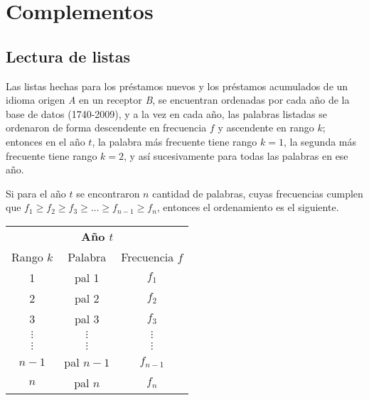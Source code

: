 \chapter{Complementos}

\section{Lectura de listas}
\label{lectura.listas}
 
Las listas hechas para los préstamos nuevos \cite{prestamos_nuevos} y los préstamos acumulados \cite{prestamos_acumulados} de un idioma origen \textit{A} en un receptor \textit{B},  se encuentran ordenadas por cada año de la base de datos (1740-2009), y a la vez en cada año, las palabras listadas se ordenaron de forma descendente en frecuencia $f$ y ascendente en rango $k$; entonces en el año $t$, la palabra más frecuente tiene rango $k=1$, la segunda más frecuente  tiene rango $k=2$, y así sucesivamente para todas las palabras en ese año. 


Si para el año $t$  se encontraron $n$ cantidad de palabras, cuyas frecuencias cumplen que $f_{1} \geq f_{2} \geq  f_{3} \geq   \dots \geq  f_{n-1} \geq  f_{n}$,  entonces el ordenamiento es el siguiente. 

\begin{table*}[htb]
	\centering
	\begin{tabular}{ccc}
		\multicolumn{3}{c}{\textbf{Año $t$}}          \\
		Rango $k$     & Palabra    & Frecuencia $f$    \\
		1             & pal 1      & $f_{1}$            \\
		2             & pal 2      & $f_{2}$             \\
		3             & pal 3      & $f_{3}$              \\
		$\vdots$      & $\vdots$   & $\vdots$         \\
		$\vdots$      & $\vdots$   & $\vdots$         \\
		$n-1$         & pal $n-1$  & $f_{n-1}$             \\
		$n$           & pal $n$    & $f_{n}$          
	\end{tabular}
\end{table*}


